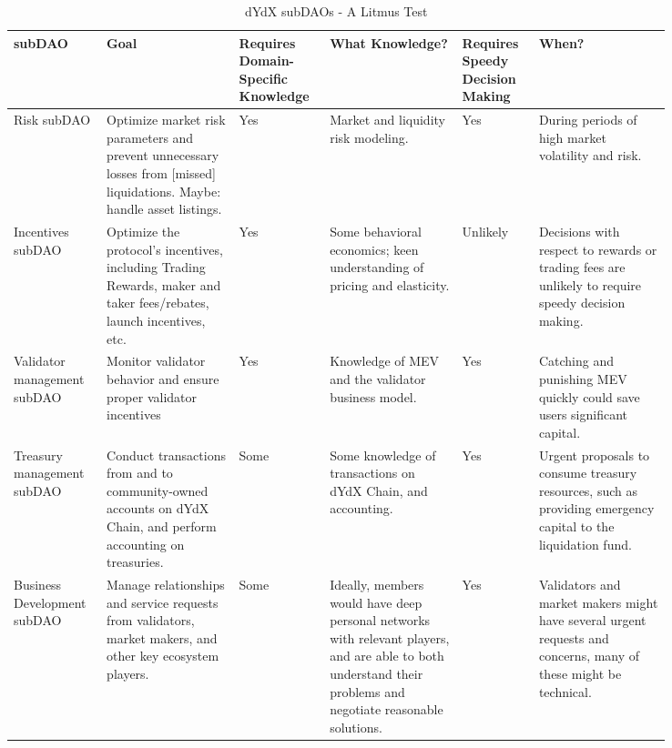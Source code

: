             \begin{table}[htp]
                \small
                \centering
                \captionsetup{justification=centering, font=large}
                \caption{dYdX subDAOs - A Litmus Test}
                \begin{tabular}{p{0.1\linewidth} || p{0.18\linewidth} p{0.1\linewidth} p{0.18\linewidth} p{0.1\linewidth} p{0.18\linewidth}}
                    \toprule
                    \textbf{subDAO} & \textbf{Goal} & \textbf{Requires Domain-Specific Knowledge} & \textbf{What Knowledge?} & \textbf{Requires Speedy Decision Making} & \textbf{When?} \\
                    \midrule
                    Risk subDAO & Optimize market risk parameters and prevent unnecessary losses from [missed] liquidations. Maybe: handle asset listings. & Yes & Market and liquidity risk modeling. & Yes & During periods of high market volatility and risk. \\
                    \hline
                    Incentives subDAO & Optimize the protocol's incentives, including Trading Rewards, maker and taker fees/rebates, launch incentives, etc. & Yes & Some behavioral economics; keen understanding of pricing and elasticity. & Unlikely & Decisions with respect to rewards or trading fees are unlikely to require speedy decision making. \\
                    \hline
                    Validator management subDAO & Monitor validator behavior and ensure proper validator incentives & Yes & Knowledge of MEV and the validator business model. & Yes & Catching and punishing MEV quickly could save users significant capital. \\
                    \hline
                    Treasury management subDAO & Conduct transactions from and to community-owned accounts on dYdX Chain, and perform accounting on treasuries. & Some & Some knowledge of transactions on dYdX Chain, and accounting. & Yes & Urgent proposals to consume treasury resources, such as providing emergency capital to the liquidation fund. \\
                    \hline 
                    Business Development subDAO & Manage relationships and service requests from validators, market makers, and other key ecosystem players. & Some & Ideally, members would have deep personal networks with relevant players, and are able to both understand their problems and negotiate reasonable solutions. & Yes & Validators and market makers might have several urgent requests and concerns, many of these might be technical.\\
                    \bottomrule
                \end{tabular}
                \label{tab:subDAOs}
            \end{table}

